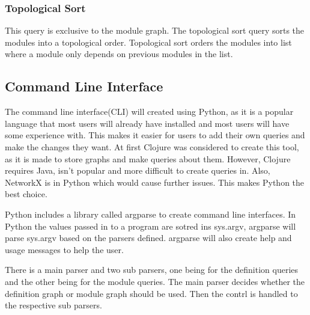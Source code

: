 \subsubsection{Topological Sort}

This query is exclusive to the module graph. The topological sort query sorts
the modules into a topological order. Topological sort orders the modules into
list where a module only depends on previous modules in the list.


\subsection{Command Line Interface}\label{sub:Agda Tree CLI}

The command line interface(CLI) will created using Python, as it is a popular
language that most users will already have installed and most users will have
some experience with. This makes it easier for users to add their own queries
and make the changes they want. At first Clojure was considered to create this
tool, as it is made to store graphs and make queries about them. However,
Clojure requires Java, isn't popular and more difficult to create queries in.
Also, NetworkX is in Python which would cause further issues. This makes Python
the best choice.

Python includes a library called argparse to create command line interfaces. In
Python the values passed in to a program are sotred ins sys.argv, argparse will
parse sys.argv based on the parsers defined. argparse will also create help and
usage messages to help the user.

There is a main parser and two sub parsers, one being for the definition
queries and the other being for the module queries. The main parser decides
whether the definition graph or module graph should be used. Then the contrl is
handled to the respective sub parsers.

